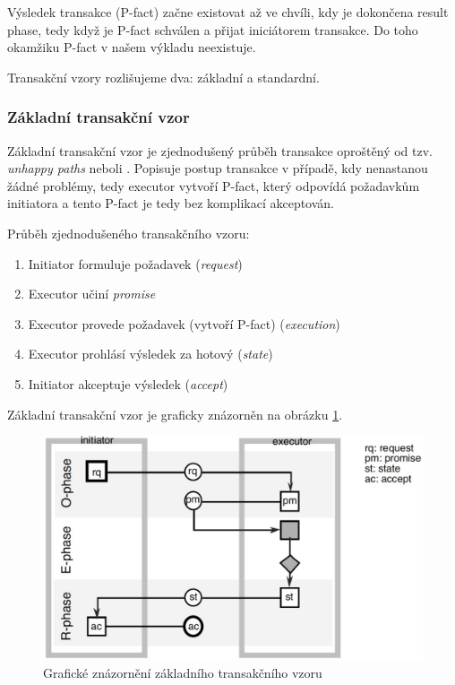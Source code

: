 Výsledek transakce (P-fact) začne existovat až ve chvíli, kdy je dokončena result phase, tedy když je P-fact schválen a přijat iniciátorem transakce. Do toho okamžiku P-fact v našem výkladu neexistuje.

Transakční vzory rozlišujeme dva: základní a standardní.

\subsubsection{Základní transakční vzor}
Základní transakční vzor je zjednodušený průběh transakce oproštěný od tzv. \textit{unhappy paths} neboli . Popisuje postup transakce v případě, kdy nenastanou žádné problémy, tedy executor vytvoří P-fact, který odpovídá požadavkům initiatora a tento P-fact je tedy bez komplikací akceptován.

Průběh zjednodušeného transakčního vzoru:

\begin{enumerate}
\item Initiator formuluje požadavek (\textit{request})
\item Executor učiní \textit{promise}
\item Executor provede požadavek (vytvoří P-fact) (\textit{execution})
\item Executor prohlásí výsledek za hotový (\textit{state})
\item Initiator akceptuje výsledek (\textit{accept})
\end{enumerate}

Základní transakční vzor je graficky znázorněn na obrázku \ref{fig:basic_transaction_pattern}.

\begin{center}
\begin{figure}[H]
\centerline{\includegraphics[scale=0.4]{obrazky/basic-transaction-pattern}}
\caption{Grafické znázornění základního transakčního vzoru \cite{Dietz2006}}
\label{fig:basic_transaction_pattern}
\end{figure}
\end{center}

